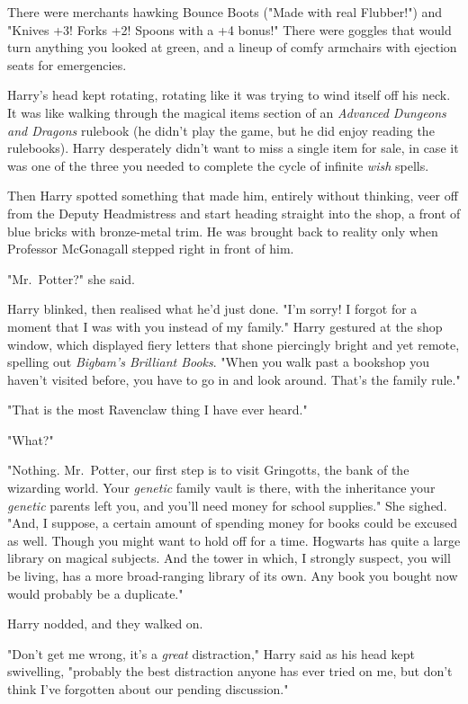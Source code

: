 There were merchants hawking Bounce Boots ("Made with real Flubber!") and 
"Knives +3! Forks +2! Spoons with a +4 bonus!" There were goggles that would 
turn anything you looked at green, and a lineup of comfy armchairs with 
ejection seats for emergencies.

Harry's head kept rotating, rotating like it was trying to wind itself off his 
neck. It was like walking through the magical items section of an 
\emph{Advanced Dungeons and Dragons} rulebook (he didn't play the game, but he 
did enjoy reading the rulebooks). Harry desperately didn't want to miss a 
single item for sale, in case it was one of the three you needed to complete 
the cycle of infinite \emph{wish} spells.

Then Harry spotted something that made him, entirely without thinking, veer off 
from the Deputy Headmistress and start heading straight into the shop, a front 
of blue bricks with bronze-metal trim. He was brought back to reality only when 
Professor McGonagall stepped right in front of him.

"Mr.~Potter?" she said.

Harry blinked, then realised what he'd just done. "I'm sorry! I forgot for a 
moment that I was with you instead of my family." Harry gestured at the shop 
window, which displayed fiery letters that shone piercingly bright and yet 
remote, spelling out \emph{Bigbam's Brilliant Books}. "When you walk past a 
bookshop you haven't visited before, you have to go in and look around. That's 
the family rule."

"That is the most Ravenclaw thing I have ever heard."

"What?"

"Nothing. Mr.~Potter, our first step is to visit Gringotts, the bank of the 
wizarding world. Your \emph{genetic} family vault is there, with the 
inheritance your \emph{genetic} parents left you, and you'll need money for 
school supplies." She sighed. "And, I suppose, a certain amount of spending 
money for books could be excused as well. Though you might want to hold off for 
a time. Hogwarts has quite a large library on magical subjects. And the tower 
in which, I strongly suspect, you will be living, has a more broad-ranging 
library of its own. Any book you bought now would probably be a duplicate."

Harry nodded, and they walked on.

"Don't get me wrong, it's a \emph{great} distraction," Harry said as his head 
kept swivelling, "probably the best distraction anyone has ever tried on me, 
but don't think I've forgotten about our pending discussion."

